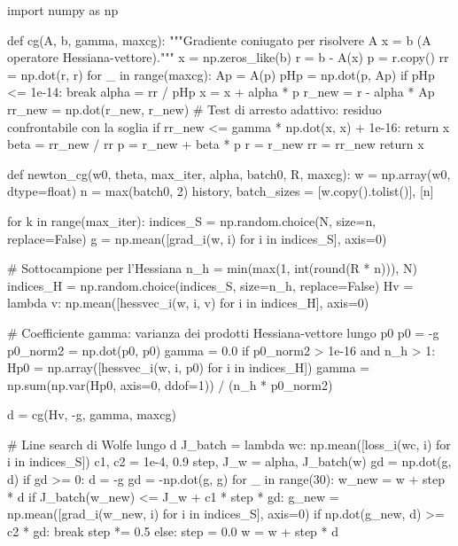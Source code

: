 \documentclass[a4paper,12pt]{article}
\numberwithin{equation}{section}
\numberwithin{figure}{section}
\numberwithin{table}{section}
\begin{document}
\begin{pythoncode}[title= Newton-CG]

import numpy as np

def cg(A, b, gamma, maxcg):
    """Gradiente coniugato per risolvere A x = b (A operatore Hessiana-vettore)."""
    x = np.zeros_like(b)
    r = b - A(x)
    p = r.copy()
    rr = np.dot(r, r)
    for _ in range(maxcg):
        Ap = A(p)
        pHp = np.dot(p, Ap)
        if pHp <= 1e-14:
            break
        alpha = rr / pHp
        x = x + alpha * p
        r_new = r - alpha * Ap
        rr_new = np.dot(r_new, r_new)
        # Test di arresto adattivo: residuo confrontabile con la soglia
        if rr_new <= gamma * np.dot(x, x) + 1e-16:
            return x
        beta = rr_new / rr
        p = r_new + beta * p
        r = r_new
        rr = rr_new
    return x

def newton_cg(w0, theta, max_iter, alpha, batch0, R, maxcg):
    w = np.array(w0, dtype=float)
    n = max(batch0, 2)
    history, batch_sizes = [w.copy().tolist()], [n]

    for k in range(max_iter):
        indices_S = np.random.choice(N, size=n, replace=False)
        g = np.mean([grad_i(w, i) for i in indices_S], axis=0)

        # Sottocampione per l'Hessiana
        n_h = min(max(1, int(round(R * n))), N)
        indices_H = np.random.choice(indices_S, size=n_h, replace=False)
        Hv = lambda v: np.mean([hessvec_i(w, i, v) for i in indices_H], axis=0)

        # Coefficiente gamma: varianza dei prodotti Hessiana-vettore lungo p0
        p0 = -g
        p0_norm2 = np.dot(p0, p0)
        gamma = 0.0
        if p0_norm2 > 1e-16 and n_h > 1:
            Hp0 = np.array([hessvec_i(w, i, p0) for i in indices_H])
            gamma = np.sum(np.var(Hp0, axis=0, ddof=1)) / (n_h * p0_norm2)

        d = cg(Hv, -g, gamma, maxcg)

        # Line search di Wolfe lungo d
        J_batch = lambda wc: np.mean([loss_i(wc, i) for i in indices_S])
        c1, c2 = 1e-4, 0.9
        step, J_w = alpha, J_batch(w)
        gd = np.dot(g, d)
        if gd >= 0:
            d = -g
            gd = -np.dot(g, g)
        for _ in range(30):
            w_new = w + step * d
            if J_batch(w_new) <= J_w + c1 * step * gd:
                g_new = np.mean([grad_i(w_new, i) for i in indices_S], axis=0)
                if np.dot(g_new, d) >= c2 * gd:
                    break
            step *= 0.5
        else:
            step = 0.0
        w = w + step * d


\end{pythoncode}
\end{document}
